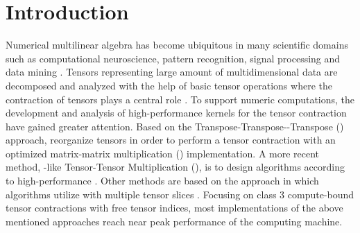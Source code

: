 \section{Introduction}
\label{sec:introduction}
Numerical multilinear algebra has become ubiquitous in many scientific domains such as computational neuroscience, pattern recognition, signal processing and data mining \cite{karahan:2015:tensor, papalexakis:2017:tensors}. %
Tensors representing large amount of multidimensional data are decomposed and analyzed with the help of basic tensor operations where the contraction of tensors plays a central role \cite{lee:2018:fundamental, kolda:2009:decompositions}. 
To support numeric computations, the development and analysis of high-performance kernels for the tensor contraction have gained greater attention.
Based on the Transpose-Transpose--Transpose () approach, \cite{bader:2006:algorithm862,solomonik:2013:cyclops} reorganize tensors in order to perform a tensor contraction with an optimized matrix-matrix multiplication () implementation. %
A more recent method, -like Tensor-Tensor Multiplication (), is to design algorithms according to high-performance  \cite{springer:2018:design,matthews:2018:high,abadi:2016:tensorflow}.
Other methods are based on the  approach in which algorithms utilize  with multiple tensor slices \cite{dinapoli:2014:towards.efficient.use, li:2015:input, shi:2016:tensor.contraction}.
Focusing on class 3 compute-bound tensor contractions with free tensor indices, most implementations of the above mentioned approaches reach near peak performance of the computing machine\cite{springer:2018:design, matthews:2018:high,shi:2016:tensor.contraction}. 

